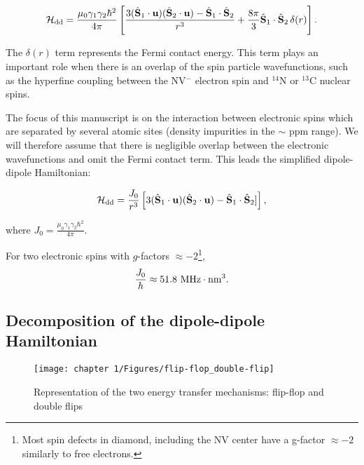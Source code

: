 \documentclass[a4paper, 11pt]{report}
\begin{document}
\begin{equation}
\label{eq. dipole quantique J coupling}
\mathcal{H}_{\rm dd}=\frac{\mu_0 \gamma_1 \gamma_2 \hbar^2}{4 \pi}\left[ \frac{3 (\hat{\mathbf{S}}_1\cdot\mathbf{u})(\hat{\mathbf{S}}_2\cdot\mathbf{u}) - \hat{\mathbf{S}}_1\cdot\hat{\mathbf{S}}_2}{r^3}+\frac{8\pi}{3}\hat{\mathbf{S}}_1\cdot\hat{\mathbf{S}}_2\,\delta(r)\right].
\end{equation}

The $\delta(r)$ term represents the Fermi contact energy. This term plays an important role when there is an overlap of the spin particle wavefunctions, such as the hyperfine coupling between the NV$^-$ electron spin and $^{14}$N \cite{doherty2012theory} or  $^{13}$C \cite{smeltzer201113c} nuclear spins.

The focus of this manuscript is on the interaction between electronic spins which are separated by several atomic sites (density impurities in the $\sim$ ppm range). We will therefore assume that there is negligible overlap between the electronic wavefunctions and omit the Fermi contact term. This leads the simplified dipole-dipole Hamiltonian:

\begin{equation}
\mathcal{H}_{\rm dd}= \frac{J_0}{r^3}\left[ 3 (\hat{\mathbf{S}}_1\cdot\mathbf{u})(\hat{\mathbf{S}}_2\cdot\mathbf{u}) - \hat{\mathbf{S}}_1\cdot\hat{\mathbf{S}}_2] \right],
\end{equation}

where $J_0=\frac{\mu_0 \gamma_1 \gamma_2 \hbar^2}{4 \pi}$.

For two electronic spins with $g$-factors $\approx -2$\footnote{Most spin defects in diamond, including the NV center have a g-factor $\approx -2$ similarly to free electrons.}, 
\begin{equation*}
\frac{J_0}{h} \approx 51.8\ \rm{MHz}\cdot \rm{nm}^3.
\end{equation*}

\subsection{Decomposition of the dipole-dipole Hamiltonian}
\label{sec flip-flop et double flip}

\begin{figure}[h!]
\centering
\texttt{[image: chapter 1/Figures/flip-flop\_double-flip]}
\caption{Representation of the two energy transfer mechanisms: flip-flop and double flips} 
\label{flip flop double flip}
\end{figure}
\end{document}
